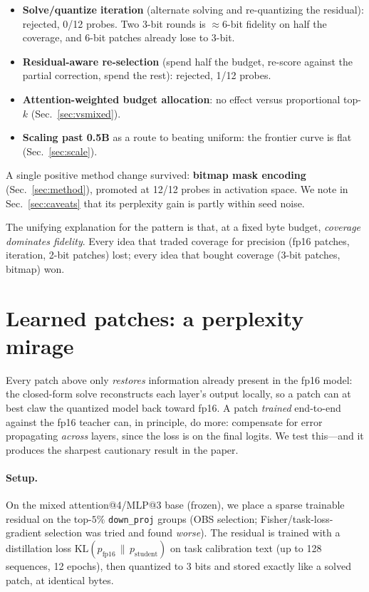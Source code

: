 \documentclass[manuscript, screen, review]{jair}
\newcommand{\code}[1]{\texttt{#1}}
\begin{document}
\begin{itemize}
  \item \textbf{Solve/quantize iteration} (alternate solving and re-quantizing
    the residual): rejected, 0/12 probes. Two 3-bit rounds is $\approx$6-bit
    fidelity on half the coverage, and 6-bit patches already lose to 3-bit.
  \item \textbf{Residual-aware re-selection} (spend half the budget, re-score
    against the partial correction, spend the rest): rejected, 1/12 probes.
  \item \textbf{Attention-weighted budget allocation}: no effect versus
    proportional top-$k$ (Sec.~\ref{sec:vsmixed}).
  \item \textbf{Scaling past 0.5B} as a route to beating uniform: the frontier
    curve is flat (Sec.~\ref{sec:scale}).
\end{itemize}

A single positive method change survived: \textbf{bitmap mask encoding}
(Sec.~\ref{sec:method}), promoted at 12/12 probes in activation space. We note
in Sec.~\ref{sec:caveats} that its perplexity gain is partly within seed noise.

The unifying explanation for the pattern is that, at a fixed byte budget,
\emph{coverage dominates fidelity}. Every idea that traded coverage for
precision (fp16 patches, iteration, 2-bit patches) lost; every idea that bought
coverage (3-bit patches, bitmap) won.

\section{Learned patches: a perplexity mirage}
\label{sec:learned}

Every patch above only \emph{restores} information already present in the fp16
model: the closed-form solve reconstructs each layer's output locally, so a
patch can at best claw the quantized model back toward fp16. A patch
\emph{trained} end-to-end against the fp16 teacher can, in principle, do more:
compensate for error propagating \emph{across} layers, since the loss is on the
final logits. We test this---and it produces the sharpest cautionary result in
the paper.

\paragraph{Setup.} On the mixed attention@4/MLP@3 base (frozen), we place a
sparse trainable residual on the top-$5\%$ \code{down\_proj} groups (OBS
selection; Fisher/task-loss-gradient selection was tried and found
\emph{worse}). The residual is trained with a distillation loss
$\mathrm{KL}(p_\text{fp16}\,\|\,p_\text{student})$ on task calibration text
(up to 128 sequences, 12 epochs), then quantized to 3 bits and stored exactly
like a solved patch, at identical bytes.
\end{document}
